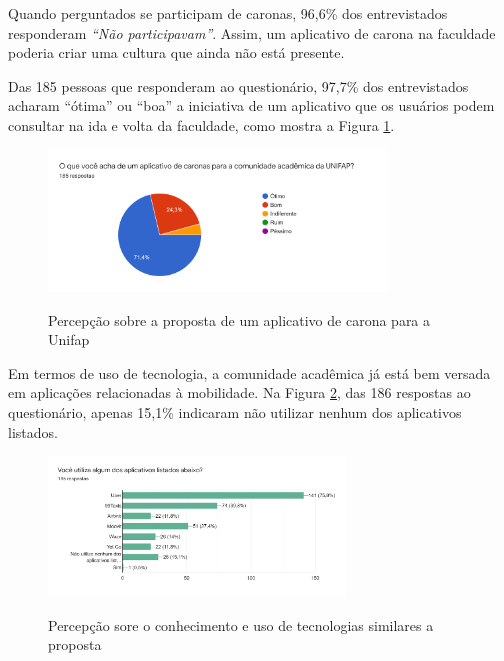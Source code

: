Quando perguntados se participam de caronas, 96,6\% dos entrevistados responderam \textit{“Não participavam”}. Assim, um aplicativo de carona na faculdade poderia criar uma cultura que ainda não está presente.

Das 185 pessoas que responderam ao questionário, 97,7\% dos entrevistados acharam “ótima” ou “boa” a iniciativa de um aplicativo que os usuários podem consultar na ida e volta da faculdade, como mostra a Figura \ref{fig:percepcao}.
\begin{figure}[!hbtp]
	\centering
	\caption{Percepção sobre a proposta de um aplicativo de carona para a Unifap}
	\includegraphics[width=0.8\textwidth]{./04-figuras/questionario/15.png}
	\label{fig:percepcao}
\end{figure}

Em termos de uso de tecnologia, a comunidade acadêmica já está bem versada em aplicações relacionadas à mobilidade. Na Figura \ref{fig:conhecimento-sobre-apps}, das 186 respostas ao questionário, apenas 15,1\% indicaram não utilizar nenhum dos aplicativos listados.

\begin{figure}[!hbtp]
	\centering
	\caption{Percepção sore o conhecimento e uso de tecnologias similares a proposta}
	\includegraphics[width=0.7\textwidth]{./04-figuras/questionario/16.png}
	\label{fig:conhecimento-sobre-apps}
\end{figure}

